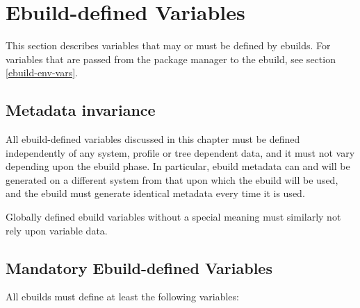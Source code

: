 \chapter{Ebuild-defined Variables}
\label{ebuild-vars}

\note This section describes variables that may or must be defined by ebuilds. For
variables that are passed from the package manager to the ebuild, see section \ref{ebuild-env-vars}.

\section{Metadata invariance}
\label{metadata-invariance}

All ebuild-defined variables discussed in this chapter must be defined independently of
any system, profile or tree dependent data, and it must not vary depending upon the ebuild
phase. In particular, ebuild metadata can and will be generated on a different system from that upon
which the ebuild will be used, and the ebuild must generate identical metadata every time it
is used.

Globally defined ebuild variables without a special meaning must similarly not rely upon
variable data.


\section{Mandatory Ebuild-defined Variables}

All ebuilds must define at least the following variables:

